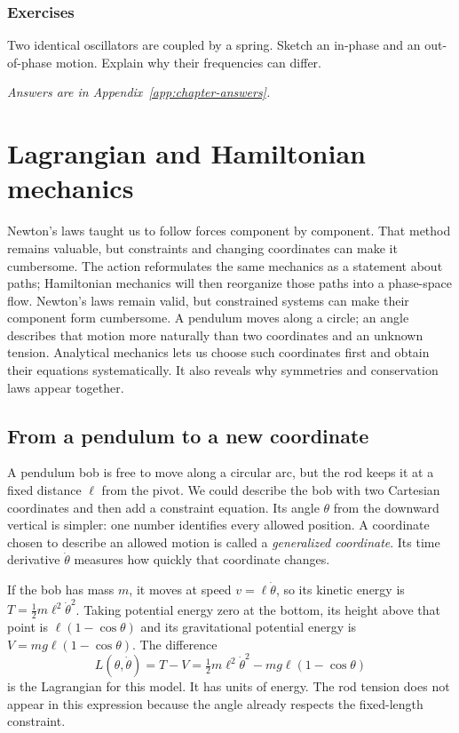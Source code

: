 \documentclass[11pt,oneside]{book}
\theoremstyle{reviewstyle}
\newcommand{\learningcheck}[1]{\subsection*{Exercises}\noindent #1\par\smallskip\noindent\emph{Answers are in Appendix~\ref{app:chapter-answers}.}}
\begin{document}
\learningcheck{Two identical oscillators are coupled by a spring. Sketch an in-phase and an out-of-phase motion. Explain why their frequencies can differ.}

\chapter{Lagrangian and Hamiltonian mechanics}
Newton's laws taught us to follow forces component by component. That method remains valuable, but constraints and changing coordinates can make it cumbersome. The action reformulates the same mechanics as a statement about paths; Hamiltonian mechanics will then reorganize those paths into a phase-space flow.
Newton's laws remain valid, but constrained systems can make their component form cumbersome. A pendulum moves along a circle; an angle describes that motion more naturally than two coordinates and an unknown tension. Analytical mechanics lets us choose such coordinates first and obtain their equations systematically. It also reveals why symmetries and conservation laws appear together.

\section{From a pendulum to a new coordinate}
A pendulum bob is free to move along a circular arc, but the rod keeps it at a fixed distance $\ell$ from the pivot. We could describe the bob with two Cartesian coordinates and then add a constraint equation. Its angle $\theta$ from the downward vertical is simpler: one number identifies every allowed position. A coordinate chosen to describe an allowed motion is called a \emph{generalized coordinate}. Its time derivative $\dot\theta$ measures how quickly that coordinate changes.

If the bob has mass $m$, it moves at speed $v=\ell\dot\theta$, so its kinetic energy is $T=\tfrac12m\ell^2\dot\theta^2$. Taking potential energy zero at the bottom, its height above that point is $\ell(1-\cos\theta)$ and its gravitational potential energy is $V=mg\ell(1-\cos\theta)$. The difference
\begin{equation}
L(\theta,\dot\theta)=T-V
=\tfrac12m\ell^2\dot\theta^2-mg\ell(1-\cos\theta)
\end{equation}
is the Lagrangian for this model. It has units of energy. The rod tension does not appear in this expression because the angle already respects the fixed-length constraint.
\end{document}
